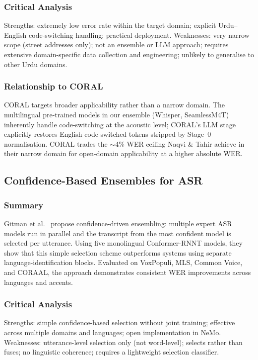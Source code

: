 \subsubsection{Critical Analysis}
Strengths: extremely low error rate within the target domain; explicit Urdu--English code-switching handling; practical deployment. Weaknesses: very narrow scope (street addresses only); not an ensemble or LLM approach; requires extensive domain-specific data collection and engineering; unlikely to generalise to other Urdu domains.

\subsubsection{Relationship to CORAL}
CORAL targets broader applicability rather than a narrow domain. The multilingual pre-trained models in our ensemble (Whisper, SeamlessM4T) inherently handle code-switching at the acoustic level; CORAL's LLM stage explicitly restores English code-switched tokens stripped by Stage~0 normalisation. CORAL trades the $\sim$4\% WER ceiling Naqvi \& Tahir achieve in their narrow domain for open-domain applicability at a higher absolute WER.

\subsection{Confidence-Based Ensembles for ASR}
\label{ssec:lit-gitman}

\subsubsection{Summary}
Gitman et al.~\cite{gitman2023confidence} propose confidence-driven ensembling: multiple expert ASR models run in parallel and the transcript from the most confident model is selected per utterance. Using five monolingual Conformer-RNNT models, they show that this simple selection scheme outperforms systems using separate language-identification blocks. Evaluated on VoxPopuli, MLS, Common Voice, and CORAAL, the approach demonstrates consistent WER improvements across languages and accents.

\subsubsection{Critical Analysis}
Strengths: simple confidence-based selection without joint training; effective across multiple domains and languages; open implementation in NeMo. Weaknesses: utterance-level selection only (not word-level); selects rather than fuses; no linguistic coherence; requires a lightweight selection classifier.

